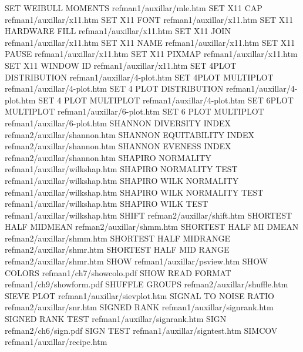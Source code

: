 SET WEIBULL MOMENTS                     refman1/auxillar/mle.htm
SET X11 CAP                             refman1/auxillar/x11.htm
SET X11 FONT                            refman1/auxillar/x11.htm
SET X11 HARDWARE FILL                   refman1/auxillar/x11.htm
SET X11 JOIN                            refman1/auxillar/x11.htm
SET X11 NAME                            refman1/auxillar/x11.htm
SET X11 PAUSE                           refman1/auxillar/x11.htm
SET X11 PIXMAP                          refman1/auxillar/x11.htm
SET X11 WINDOW ID                       refman1/auxillar/x11.htm
SET 4PLOT DISTRIBUTION                  refman1/auxillar/4-plot.htm
SET 4PLOT MULTIPLOT                     refman1/auxillar/4-plot.htm
SET 4 PLOT DISTRIBUTION                 refman1/auxillar/4-plot.htm
SET 4 PLOT MULTIPLOT                    refman1/auxillar/4-plot.htm
SET 6PLOT MULTIPLOT                     refman1/auxillar/6-plot.htm
SET 6 PLOT MULTIPLOT                    refman1/auxillar/6-plot.htm
SHANNON DIVERSITY INDEX                 refman2/auxillar/shannon.htm
SHANNON EQUITABILITY INDEX              refman2/auxillar/shannon.htm
SHANNON EVENESS INDEX                   refman2/auxillar/shannon.htm
SHAPIRO NORMALITY                       refman1/auxillar/wilkshap.htm
SHAPIRO NORMALITY TEST                  refman1/auxillar/wilkshap.htm
SHAPIRO WILK NORMALITY                  refman1/auxillar/wilkshap.htm
SHAPIRO WILK NORMALITY TEST             refman1/auxillar/wilkshap.htm
SHAPIRO WILK TEST                       refman1/auxillar/wilkshap.htm
SHIFT                                   refman2/auxillar/shift.htm
SHORTEST HALF MIDMEAN                   refman2/auxillar/shmm.htm
SHORTEST HALF MI DMEAN                  refman2/auxillar/shmm.htm
SHORTEST HALF MIDRANGE                  refman2/auxillar/shmr.htm
SHORTEST HALF MID RANGE                 refman2/auxillar/shmr.htm
SHOW                                    refman1/auxillar/psview.htm
SHOW COLORS                             refman1/ch7/showcolo.pdf
SHOW READ FORMAT                        refman1/ch9/showform.pdf
SHUFFLE GROUPS                          refman2/auxillar/shuffle.htm
SIEVE PLOT                              refman1/auxillar/sievplot.htm
SIGNAL TO NOISE RATIO                   refman2/auxillar/snr.htm
SIGNED RANK                             refman1/auxillar/signrank.htm
SIGNED RANK TEST                        refman1/auxillar/signrank.htm
SIGN                                    refman2/ch6/sign.pdf
SIGN TEST                               refman1/auxillar/signtest.htm
SIMCOV                                  refman1/auxillar/recipe.htm
